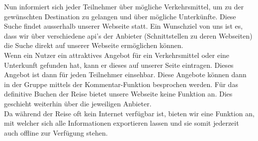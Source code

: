 \documentclass[10pt,a4paper,titlepage,twoside,german,final]{zhawreprt}
\numberwithin{table}{chapter}
\begin{document}
Nun informiert sich jeder Teilnehmer über mögliche Verkehrsmittel, um zu der gewünschten Destination zu gelangen und über mögliche Unterkünfte. Diese Suche findet ausserhalb unserer Webseite statt. Ein Wunschziel von uns ist es, dass wir über verschiedene \gls{api}'s der Anbieter (Schnittstellen zu deren Webseiten) die Suche direkt auf unserer Webseite ermöglichen können.\\
Wenn ein Nutzer ein attraktives Angebot für ein Verkehrsmittel oder eine Unterkunft gefunden hat, kann er dieses auf unserer Seite eintragen. Dieses Angebot ist dann für jeden Teilnehmer einsehbar. Diese Angebote können dann in der Gruppe mittels der Kommentar-Funktion besprochen werden. Für das definitive Buchen der Reise bietet unsere Webseite keine Funktion an. Dies geschieht weiterhin über die jeweiligen Anbieter.\\
Da während der Reise oft kein Internet verfügbar ist, bieten wir eine Funktion an, mit welcher sich alle Informationen exportieren lassen und sie somit jederzeit auch offline zur Verfügung stehen.
\end{document}
